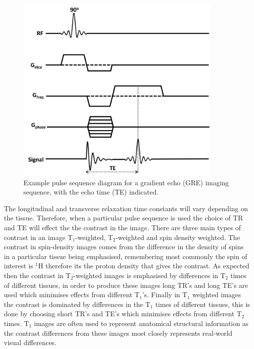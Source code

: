 \documentclass[class=article, crop=false]{standalone}
\begin{document}
\begin{figure}
    \centering
    \includegraphics[width=0.9\textwidth]{Figures/Theory/GRE_sequence.png}
    \caption{Example pulse sequence diagram for a gradient echo (GRE) imaging sequence, with the echo time (TE) indicated.}
    \label{fig:theory:GRE}
\end{figure}

The longitudinal and transverse relaxation time constants will vary depending on the tissue. Therefore, when a particular pulse sequence is used the choice of TR and TE will effect the the contrast in the image. There are three main types of contrast in an image T$_1$-weighted, T$_2$-weighted and spin density weighted. The contrast in spin-density images comes from the difference in the density of spins in a particular tissue being emphasised, remembering most commonly the spin of interest is $^1$H therefore its the proton density that gives the contrast. As expected then the contrast in T$_2$-weighted images is emphasised by differences in T$_2$ times of different tissues, in order to produce these images long TR's and long TE's are used which minimises effects from different T$_1$'s. Finally in T$_1$ weighted images the contrast is dominated by differences in the T$_1$ times of different tissues, this is done by choosing short TR's and TE's which minimises effects from different T$_2$ times. T$_1$ images are often used to represent anatomical structural information as the contrast differences from these images most closely represents real-world visual differences. 
\end{document}

